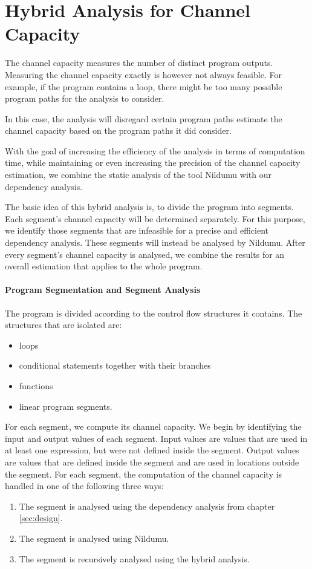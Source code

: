 \section{Hybrid Analysis for Channel Capacity}\label{sec:hybridcc}
The channel capacity measures the number of distinct program outputs. Measuring the channel capacity exactly is however not always feasible. For example, if the program contains a loop, there might be too many possible program paths for the analysis to consider.

In this case, the analysis will disregard certain program paths estimate the channel capacity based on the program paths it did consider.

With the goal of increasing the efficiency of the analysis in terms of computation time, while maintaining or even increasing the precision of the channel capacity estimation, we combine the static analysis of the tool Nildumu \cite{bechberger18} with our dependency analysis.

The basic idea of this hybrid analysis is, to divide the program into segments. Each segment's channel capacity will be determined separately. For this purpose, we identify those segments that are infeasible for a precise and efficient dependency analysis. These segments will instead be analysed by Nildumu. After every segment's channel capacity is analysed, we combine the results for an overall estimation that applies to the whole program.

\paragraph{Program Segmentation and Segment Analysis}
The program is divided according to the control flow structures it contains. The structures that are isolated are:
\begin{itemize}
    \item loops
    \item conditional statements together with their branches
    \item functions
    \item linear program segments.
\end{itemize}

For each segment, we compute its channel capacity. We begin by identifying the input and output values of each segment. Input values are values that are used in at least one expression, but were not defined inside the segment. Output values are values that are defined inside the segment and are used in locations outside the segment.
For each segment, the computation of the channel capacity is handled in one of the following three ways:
\begin{enumerate}
    \item The segment is analysed using the dependency analysis from chapter \ref{sec:design}.
    \item The segment is analysed using Nildumu.
    \item The segment is recursively analysed using the hybrid analysis.
\end{enumerate}

